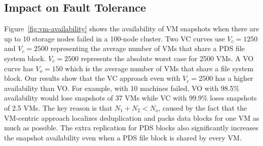 



\subsection{Impact on Fault Tolerance}

Figure~\ref{fig:vm-availability} shows the availability of VM snapshots when 
there are up to 10 storage nodes failed in a 100-node cluster. 
Two VC curves use $V_c=1250$ and $V_c=2500$ representing the average number of VMs that share a PDS file system block. 
$V_c=2500$ represents  the absolute worst case for 2500 VMs. 
A  VO curve has  $V_o=150$ which is  the average number of VMs that share a file system block. 
Our results show that the VC approach even with $V_c=2500$ has a higher availability than VO.
For example, with 10 machines failed, VO with 98.5\% availability would lose snapshots of 37 VMs 
while VC with 99.9\% loses snapshots of 2.5 VMs.
The key reason is that  $N_1 +N_2 < N_o$, caused by the fact that the VM-centric approach localizes deduplication
and packs  data blocks for one VM as much as possible.  The extra replication
for PDS blocks also significantly increases the snapshot availability even when
a PDS file block is shared by every VM.

